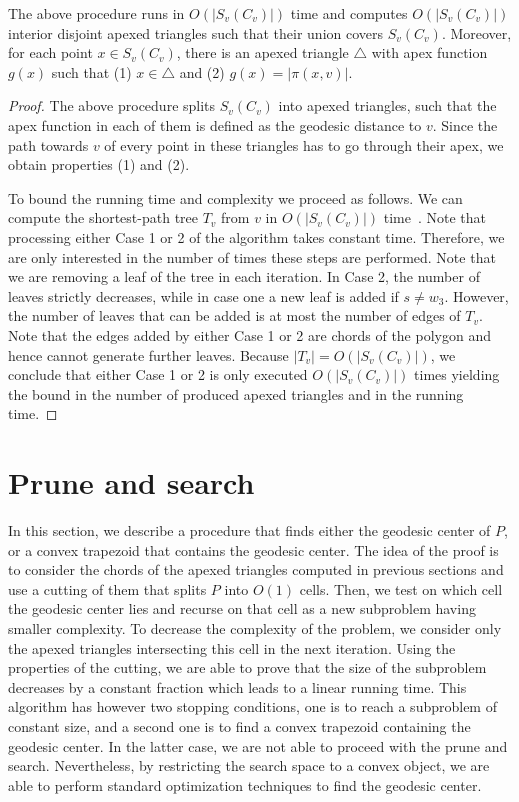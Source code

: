 \documentclass[a4paper,UKenglish]{lipics}
\newcommand{\fn}[2]{\ensuremath{S_{\scriptscriptstyle #1}(#2)}}
\newcommand{\g}[2]{\ensuremath{|\pi(#1, #2)|}}
\begin{document}
\begin{lemma}\label{lemma:Triangles inside funnels}
The above procedure runs in $O(|\fn{v}{C_v}|)$ time and computes $O(|\fn{v}{C_v}|)$ interior disjoint apexed triangles such that their union covers $\fn{v}{C_v}$. Moreover, for each point $x\in \fn{v}{C_v}$, there is an apexed triangle $\triangle$ with apex function $g(x)$ such that (1) $x\in \triangle$ and (2) $g(x) = \g{x}{v}$.
\end{lemma}
\begin{proof}
The above procedure splits $\fn{v}{C_v}$ into apexed triangles, such that the apex function in each of them is defined as the geodesic distance to $v$. Since the path towards $v$ of every point in these triangles has to go through their apex, we obtain properties (1) and (2).

To bound the running time and complexity we proceed as follows. 
We can compute the shortest-path tree $T_v$ from $v$ in $O(|\fn{v}{C_v}|)$ time~\cite{guibasShortestPathQueries}.
Note that processing either Case 1 or 2 of the algorithm takes constant time. Therefore, we are only interested in the number of times these steps are performed. Note that we are removing a leaf of the tree in each iteration. In Case 2, the number of leaves strictly decreases, while in case one a new leaf is added if $s\neq w_3$. However, the number of leaves that can be added is at most the number of edges of $T_v$. Note that the edges added by either Case 1 or 2 are chords of the polygon and hence cannot generate further leaves. Because $|T_v| = O(|\fn{v}{C_v}|)$, we conclude that either Case 1 or 2 is only executed $O(|\fn{v}{C_v}|)$ times yielding the bound in the number of produced apexed triangles and in the running time.
\end{proof}

\section{Prune and search}\label{section:Prune and search}

In this section, we describe a procedure that finds either the geodesic center of $P$, or a convex trapezoid that contains the geodesic center.
The idea of the proof is to consider the chords of the apexed triangles computed in previous sections and use a cutting of them that splits $P$ into $O(1)$ cells. Then, we test on which cell the geodesic center lies and recurse on that cell as a new subproblem having smaller complexity. To decrease the complexity of the problem, we consider only the apexed triangles intersecting this cell in the next iteration. Using the properties of the cutting, we are able to prove that the size of the subproblem decreases by a constant fraction which leads to a linear running time. This algorithm has however two stopping conditions, one is to reach a subproblem of constant size, and a second one is to find a convex trapezoid containing the geodesic center. In the latter case, we are not able to proceed with the prune and search. Nevertheless, by restricting the search space to a convex object, we are able to perform standard optimization techniques to find the geodesic center.
\end{document}
